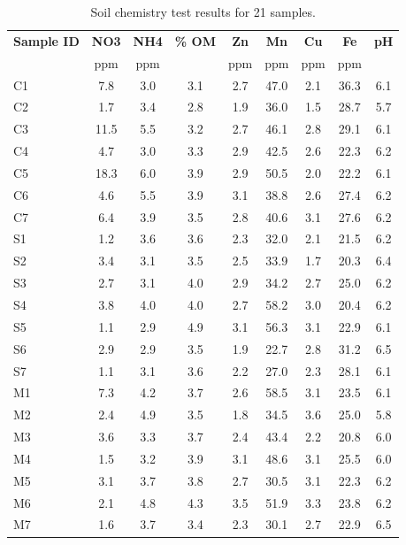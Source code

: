 \documentclass[]{msu-thesis}
\begin{document}
\begin{table}[htbp]
  \centering
  \caption[Soil chemistry test results for 21 samples]{Soil chemistry test results for 21 samples.}
    \begin{tabular}{|lcccccccc|}
    \toprule
    \multicolumn{1}{|c}{\textbf{Sample ID}} & \textbf{NO3} & \textbf{NH4} & \textbf{\% OM} & \textbf{Zn} & \textbf{Mn} & \textbf{Cu} & \textbf{Fe} & \textbf{pH} \\
          & ppm   & ppm   &       & ppm   & ppm   & ppm   & ppm   &  \\
    \midrule
    C1    & 7.8   & 3.0   & 3.1   & 2.7   & 47.0  & 2.1   & 36.3  & 6.1 \\
    C2    & 1.7   & 3.4   & 2.8   & 1.9   & 36.0  & 1.5   & 28.7  & 5.7 \\
    C3    & 11.5  & 5.5   & 3.2   & 2.7   & 46.1  & 2.8   & 29.1  & 6.1 \\
    C4    & 4.7   & 3.0   & 3.3   & 2.9   & 42.5  & 2.6   & 22.3  & 6.2 \\
    C5    & 18.3  & 6.0   & 3.9   & 2.9   & 50.5  & 2.0   & 22.2  & 6.1 \\
    C6    & 4.6   & 5.5   & 3.9   & 3.1   & 38.8  & 2.6   & 27.4  & 6.2 \\
    C7    & 6.4   & 3.9   & 3.5   & 2.8   & 40.6  & 3.1   & 27.6  & 6.2 \\
    S1    & 1.2   & 3.6   & 3.6   & 2.3   & 32.0  & 2.1   & 21.5  & 6.2 \\
    S2    & 3.4   & 3.1   & 3.5   & 2.5   & 33.9  & 1.7   & 20.3  & 6.4 \\
    S3    & 2.7   & 3.1   & 4.0   & 2.9   & 34.2  & 2.7   & 25.0  & 6.2 \\
    S4    & 3.8   & 4.0   & 4.0   & 2.7   & 58.2  & 3.0   & 20.4  & 6.2 \\
    S5    & 1.1   & 2.9   & 4.9   & 3.1   & 56.3  & 3.1   & 22.9  & 6.1 \\
    S6    & 2.9   & 2.9   & 3.5   & 1.9   & 22.7  & 2.8   & 31.2  & 6.5 \\
    S7    & 1.1   & 3.1   & 3.6   & 2.2   & 27.0  & 2.3   & 28.1  & 6.1 \\
    M1    & 7.3   & 4.2   & 3.7   & 2.6   & 58.5  & 3.1   & 23.5  & 6.1 \\
    M2    & 2.4   & 4.9   & 3.5   & 1.8   & 34.5  & 3.6   & 25.0  & 5.8 \\
    M3    & 3.6   & 3.3   & 3.7   & 2.4   & 43.4  & 2.2   & 20.8  & 6.0 \\
    M4    & 1.5   & 3.2   & 3.9   & 3.1   & 48.6  & 3.1   & 25.5  & 6.0 \\
    M5    & 3.1   & 3.7   & 3.8   & 2.7   & 30.5  & 3.1   & 22.3  & 6.2 \\
    M6    & 2.1   & 4.8   & 4.3   & 3.5   & 51.9  & 3.3   & 23.8  & 6.2 \\
    M7    & 1.6   & 3.7   & 3.4   & 2.3   & 30.1  & 2.7   & 22.9  & 6.5 \\
    \bottomrule
    \end{tabular}%
  \label{tab:chap4TabS6}%
\end{table}%
\end{document}
